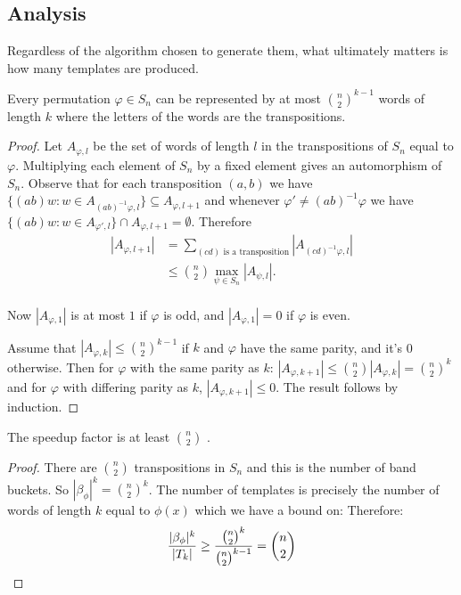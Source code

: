 \documentclass[12pt]{thesis}
\begin{document}
\subsection{Analysis}

Regardless of the algorithm chosen to generate them,
what ultimately matters is how many templates are produced.

\begin{lemma}
    Every permutation $\varphi \in S_{n}$
    can be represented by at most ${ n \choose 2}^{k -1}$
    words of length $k$
    where the letters of the words are the transpositions.
\end{lemma}

\begin{proof}
    Let $A_{\varphi, l}$ be the set of words of length $l$ in the transpositions of $S_{n}$
    equal to $\varphi$.
    Multiplying each element of $S_{n}$ by a fixed element 
    gives an automorphism of $S_{n}$.
    Observe that for each transposition $(a, b)$
    we have $\{ (ab) w \colon w \in A_{(ab)^{-1} \varphi, l} \} \subseteq A_{\varphi, l+1 }$
    and whenever $\varphi' \neq (ab)^{-1}\varphi$ we have $\{ (ab) w \colon w \in A_{\varphi', l} \} \cap A_{\varphi, l+1} = \emptyset$.
    Therefore
    \[
    \begin{split}
        |A_{\varphi, l+1}| &= \sum_{(cd) \text{ is a transposition}} |A_{(cd)^{-1}\varphi, l}| \\
                              &\leq { n \choose 2 }  \max_{\psi \in S_{n}} |A_{\psi, l}|. \\
    \end{split}
    \]

    Now $|A_{\varphi, 1}|$ is at most $1$ if $\varphi$ is odd,
    and $|A_{\varphi, 1}| = 0$ if $\varphi$ is even. 

    Assume that $|A_{\varphi, k}| \leq { n \choose 2}^{k -1}$
    if $k$ and $\varphi$ have the same parity,
    and it's 0 otherwise.
    Then for $\varphi$ with the same parity as $k$: $|A_{\varphi, k +1}| \leq { n \choose 2} |A_{\varphi, k}| = {n \choose 2}^{k}$
    and for $\varphi$ with differing parity as $k$, $|A_{\varphi, k + 1}| \leq 0$.
    The result follows by induction.
\end{proof}

\begin{theorem}
    The speedup factor is at least ${ n \choose 2 }$ .
\end{theorem}

\begin{proof}
    There are ${ n \choose 2 }$ transpositions in $S_{n}$ and this is the number
    of band buckets.
    So $|\beta_{\phi}|^{k} = {n \choose 2}^{k}$.
    The number of templates is precisely the number of words of length $k$ equal to $\phi(x)$
    which we have a bound on:
    Therefore:
    \[
        \frac{|\beta_{\phi}|^{k}}{|T_{k}|} \geq \frac{ {n \choose 2}^{k} }{ {n \choose 2}^{k-1} } = {n \choose 2}
        \qedhere
    \]
\end{proof}
\end{document}
